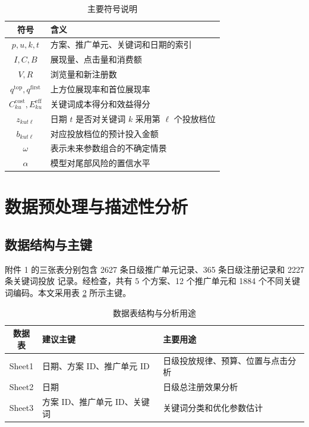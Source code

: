 \documentclass[UTF8,a4paper,zihao=-4]{ctexart}
\begin{document}
\begin{table}[H]
  \centering
  \caption{主要符号说明}
  \label{tab:symbols}
  \begin{tabularx}{0.92\textwidth}{cX}
    \toprule
    符号 & 含义 \\
    \midrule
    $p,u,k,t$ & 方案、推广单元、关键词和日期的索引 \\
    $I,C,B$ & 展现量、点击量和消费额 \\
    $V,R$ & 浏览量和新注册数 \\
    $q^{\mathrm{top}},q^{\mathrm{first}}$ & 上方位展现率和首位展现率 \\
    $C_{ku}^{\mathrm{cost}},E_{ku}^{\mathrm{eff}}$ & 关键词成本得分和效益得分 \\
    $z_{kut\ell}$ & 日期 $t$ 是否对关键词 $k$ 采用第 $\ell$ 个投放档位 \\
    $b_{kut\ell}$ & 对应投放档位的预计投入金额 \\
    $\omega$ & 表示未来参数组合的不确定情景 \\
    $\alpha$ & 模型对尾部风险的置信水平 \\
    \bottomrule
  \end{tabularx}
\end{table}

\section{数据预处理与描述性分析}

\subsection{数据结构与主键}

附件 1 的三张表分别包含 2627 条日级推广单元记录、365 条日级注册记录和 2227 条关键词投放
记录。经检查，共有 5 个方案、12 个推广单元和 1884 个不同关键词编码。本文采用表
\ref{tab:data-key} 所示主键。

\begin{table}[H]
  \centering
  \caption{数据表结构与分析用途}
  \label{tab:data-key}
  \begin{tabularx}{0.94\textwidth}{cXX}
    \toprule
    数据表 & 建议主键 & 主要用途 \\
    \midrule
    Sheet1 & 日期、方案 ID、推广单元 ID & 日级投放规律、预算、位置与点击分析 \\
    Sheet2 & 日期 & 日级总注册效果分析 \\
    Sheet3 & 方案 ID、推广单元 ID、关键词 & 关键词分类和优化参数估计 \\
    \bottomrule
  \end{tabularx}
\end{table}
\end{document}
